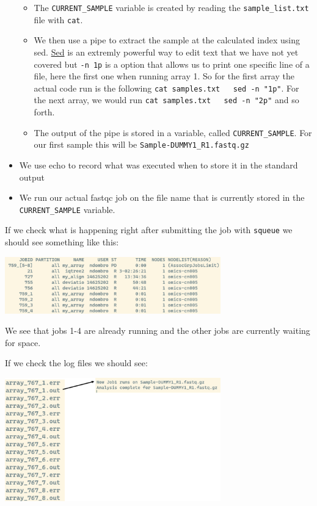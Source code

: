 \documentclass[
  letterpaper,
  DIV=11,
  numbers=noendperiod]{scrreprt}
\providecommand{\tightlist}{%
  \setlength{\itemsep}{0pt}\setlength{\parskip}{0pt}}\usepackage{longtable,booktabs,array}
\begin{document}
\begin{tcolorbox}
\begin{itemize}
  \begin{itemize}
  \tightlist
  \item
    The \texttt{CURRENT\_SAMPLE} variable is created by reading the
    \texttt{sample\_list.txt} file with \texttt{cat}.
  \item
    We then use a pipe to extract the sample at the calculated index
    using sed.
    \href{https://scienceparkstudygroup.github.io/software_information/source/cli/cli_file_manipulation.html\#sed-manipulating-the-content-of-files}{Sed}
    is an extremly powerful way to edit text that we have not yet
    covered but \texttt{-n\ 1p} is a option that allows us to print one
    specific line of a file, here the first one when running array 1. So
    for the first array the actual code run is the following
    \texttt{cat\ samples.txt\ \textbar{}\ \ sed\ -n\ "1p"}. For the next
    array, we would run
    \texttt{cat\ samples.txt\ \textbar{}\ \ sed\ -n\ "2p"} and so forth.
  \item
    The output of the pipe is stored in a variable, called
    \texttt{CURRENT\_SAMPLE}. For our first sample this will be
    \texttt{Sample-DUMMY1\_R1.fastq.gz}
  \end{itemize}
\item
  We use echo to record what was executed when to store it in the
  standard output
\item
  We run our actual fastqc job on the file name that is currently stored
  in the \texttt{CURRENT\_SAMPLE} variable.
\end{itemize}

If we check what is happening right after submitting the job with
\texttt{squeue} we should see something like this:

\begin{center}
\includegraphics[width=0.7\textwidth,height=\textheight]{../img/arrays.png}
\end{center}

We see that jobs 1-4 are already running and the other jobs are
currently waiting for space.

If we check the log files we should see:

\begin{center}
\includegraphics[width=0.7\textwidth,height=\textheight]{../img/arrays2.png}
\end{center}


\end{tcolorbox}
\end{document}
